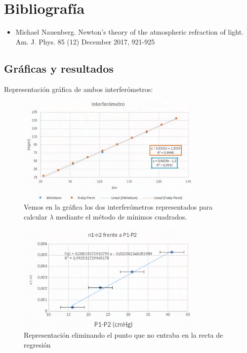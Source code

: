 \documentclass[11pt,letterpaper,twocolumn]{article}
\begin{document}
\section{Bibliografía}
\begin{itemize}
    \item Michael Nauenberg. Newton's theory of the atmospheric refraction of light. Am. J. Phys. 85 (12) December 2017, 921-925
\end{itemize}
\newpage
\onecolumn
\subsection{Gráficas y resultados}
Representación gráfica de ambos interferómetros:
\begin{figure}[H]
    \centering
    \includegraphics[width=0.8\textwidth]{img/graficaint.png}
    \caption{Vemos en la gráfica los dos interferómetros representados para calcular $\lambda$ mediante el método de mínimos cuadrados.}
    \label{fig:}
\end{figure}

\begin{figure}[H]
    \centering
    \includegraphics[width=0.8\textwidth]{img/graficap21.png}
    \caption{Representación eliminando el punto que no entraba en la recta de regresión}
    \label{fig:}
\end{figure}    
\end{document}
